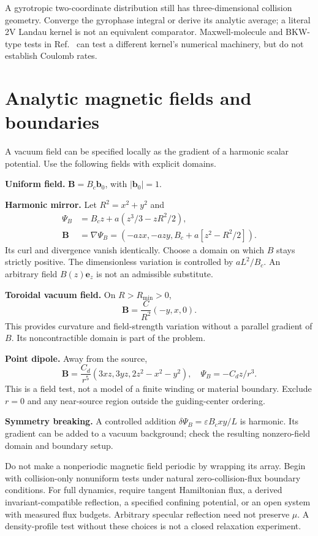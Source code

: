 \documentclass[11pt,letterpaper]{article}
\begin{document}
A gyrotropic two-coordinate distribution still has three-dimensional collision
geometry. Converge the gyrophase integral or derive its analytic average; a
literal 2V Landau kernel is not an equivalent comparator. Maxwell-molecule and
BKW-type tests in Ref.~\cite{CHWW20} can test a different kernel's numerical
machinery, but do not establish Coulomb rates.

\section{Analytic magnetic fields and boundaries}

A vacuum field can be specified locally as the gradient of a harmonic scalar
potential. Use the following fields with explicit domains.

\textbf{Uniform field.} $\bm B=B_c\bm b_0$, with $|\bm b_0|=1$.

\textbf{Harmonic mirror.} Let $R^2=x^2+y^2$ and
\begin{align}
 \Psi_B&=B_cz+a\left(z^3/3-zR^2/2\right),\\
 \bm B&=\nabla\Psi_B=(-azx,-azy,B_c+a[z^2-R^2/2]).
 \label{eq:mirrorfield}
\end{align}
Its curl and divergence vanish identically. Choose a domain on which $B$ stays
strictly positive. The dimensionless variation is controlled by $aL^2/B_c$.
An arbitrary field $B(z)\bm e_z$ is not an admissible substitute.

\textbf{Toroidal vacuum field.} On $R>R_{\min}>0$,
\begin{equation}
 \bm B=\frac{C}{R^2}(-y,x,0).
 \label{eq:toroid}
\end{equation}
This provides curvature and field-strength variation without a parallel gradient
of $B$. Its noncontractible domain is part of the problem.

\textbf{Point dipole.} Away from the source,
\begin{equation}
 \bm B=\frac{C_d}{r^5}(3xz,3yz,2z^2-x^2-y^2),
 \quad \Psi_B=-C_dz/r^3.
 \label{eq:dipole}
\end{equation}
This is a field test, not a model of a finite winding or material boundary. Exclude
$r=0$ and any near-source region outside the guiding-center ordering.

\textbf{Symmetry breaking.} A controlled addition
$\delta\Psi_B=\varepsilon B_cxy/L$ is harmonic. Its gradient can be added to a
vacuum background; check the resulting nonzero-field domain and boundary setup.

Do not make a nonperiodic magnetic field periodic by wrapping its array. Begin
with collision-only nonuniform tests under natural zero-collision-flux boundary
conditions. For full dynamics, require tangent Hamiltonian flux, a derived
invariant-compatible reflection, a specified confining potential, or an open
system with measured flux budgets. Arbitrary specular reflection need not
preserve $\mu$. A density-profile test without these choices is not a closed
relaxation experiment.
\end{document}
